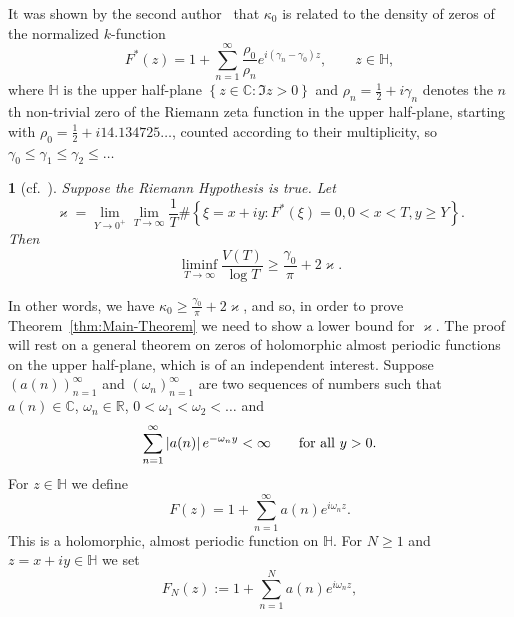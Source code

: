 \documentclass[oneside,english]{amsart}
\numberwithin{equation}{section}
\numberwithin{figure}{section}
\theoremstyle{plain}
\newtheorem{thm}{\protect\theoremname}
\theoremstyle{plain}
\theoremstyle{plain}
\theoremstyle{definition}
\providecommand{\theoremname}{Theorem}
\begin{document}
It was shown by the second author~\cite[Corollary 1.1]{Kaczorowski1991}
that $\kappa_{0}$ is related to the density of zeros of the normalized
$k$-function
\[
F^{*}(z)=1+\sum_{n=1}^{\infty}\frac{\rho_{0}}{\rho_{n}}e^{i(\gamma_{n}-\gamma_{0})z},\qquad z\in\mathbb{H},
\]
where $\mathbb{H}$ is the upper half-plane $\left\{ z\in\mathbb{C}:\Im z>0\right\} $
and $\rho_{n}=\frac{1}{2}+i\gamma_{n}$ denotes the $n$th non-trivial
zero of the Riemann zeta function in the upper half-plane, starting
with $\rho_{0}=\frac{1}{2}+i14.134725\dots$, counted according to
their multiplicity, so $\gamma_{0}\leq\gamma_{1}\leq\gamma_{2}\leq\dotsc$
\begin{thm}[{cf.~\cite[Corollary 1.1]{Kaczorowski1991}}]
\label{thm:JK-Corollary-1.1}Suppose the Riemann Hypothesis is true.
Let
\[
\varkappa=\lim_{Y\to0^{+}}\lim_{T\to\infty}\frac{1}{T}\#\left\{ \xi=x+iy:F^*(\xi)=0,0<x<T,y\geq Y\right\} .
\]
Then
\[
\liminf_{T\to\infty}\frac{V(T)}{\log T}\geq\frac{\gamma_{0}}{\pi}+2\varkappa.
\]
\end{thm}
In other words, we have $\kappa_{0}\geq\frac{\gamma_{0}}{\pi}+2\varkappa$,
and so, in order to prove Theorem~\ref{thm:Main-Theorem} we need
to show a lower bound for $\varkappa$. The proof will rest on a general
theorem on zeros of holomorphic almost periodic functions on the upper
half-plane, which is of an independent interest. Suppose $(a(n))_{n=1}^{\infty}$
and $(\omega_{n})_{n=1}^{\infty}$ are two sequences of numbers such
that $a(n)\in\mathbb{C}$, $\omega_{n}\in\mathbb{R}$, $0<\omega_{1}<\omega_{2}<\ldots$
and 
\[
\sum_{n=1}^{\infty}\left|a(n)\right|e^{-\omega_{n}y}<\infty\qquad\text{for all \ensuremath{y>0}}.
\]
For $z\in{\mathbb{H}}$ we define 
\begin{equation}
F(z)=1+\sum_{n=1}^{\infty}a(n)e^{i\omega_{n}z}.\label{eq:F}
\end{equation}
This is a holomorphic, almost periodic function on $\mathbb{H}$.
For $N\geq1$ and $z=x+iy\in{\mathbb{H}}$ we set 
\begin{equation}
F_{N}(z):=1+\sum_{n=1}^{N}a(n)e^{i\omega_{n}z},\label{eq:F_N}
\end{equation}
 
\end{document}
